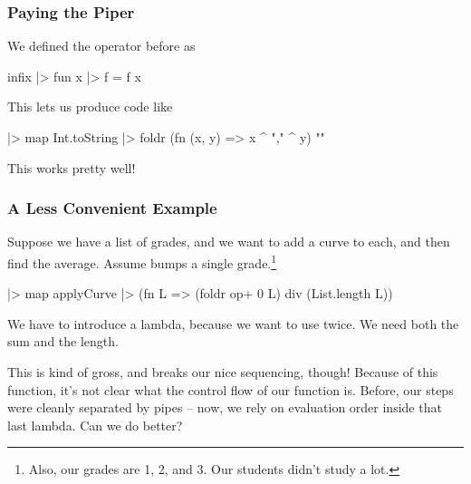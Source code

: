 \documentclass[aspectratio=169]{beamer}
\begin{document}
\begin{frame}[fragile]
  \frametitle{Paying the Piper}

  We defined the \code{|>} operator before as
  \begin{codeblock}
    infix |>
    fun x |> f = f x
  \end{codeblock}

  \pause
  \vspace{\fill}

  This lets us produce code like
  \begin{codeblock}
    [1, 2, 3]
    |> map Int.toString
    |> foldr (fn (x, y) => x ^ "," ^ y) ""
  \end{codeblock}

  \pause
  \vspace{\fill}

  This works pretty well!
\end{frame}

\begin{frame}[fragile]
  \frametitle{A Less Convenient Example}

  Suppose we have a list of grades, and we want to add a curve to each,
  and then find the average. Assume
   bumps a single grade.\footnote{
    Also, our grades are 1, 2, and 3. Our students didn't study a lot.
  }

  \pause
  \vspace{\fill}

  \begin{codeblock}
    [1, 2, 3]
    |> map applyCurve
    |> (fn L => (foldr op+ 0 L) div (List.length L))
  \end{codeblock}

  \pause
  \vspace{\fill}

  We have to introduce a lambda, because we want to use  twice.
  We need both the sum and the length.

  \pause
  \vspace{\fill}

  This is kind of gross, and breaks our nice sequencing, though! Because of
  this  function, it's not clear what the control flow of our
  function is. Before, our steps were cleanly separated by pipes -- now,
  we rely on evaluation order inside that last lambda. Can we do better?
\end{frame}
\end{document}
